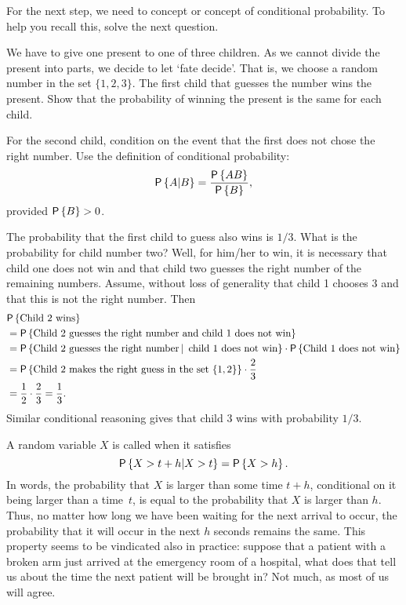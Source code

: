 For the next step, we need to concept or  concept of conditional probability. To help you recall this, solve the next question.

\begin{exercise} 
  We have to give one present to one of three children. As we cannot
  divide the present into parts, we decide to let `fate decide'. That
  is, we choose a random number in the set $\{1, 2, 3\}$. The first
  child that guesses the number wins the present. Show that the
  probability of winning the present is the same for each child.
  \begin{hint}
    For the second child, condition on the event that the first does not chose the right number.
    Use the definition of conditional probability:
    \begin{equation*}
    \P{A|B} = \frac{\P{AB}}{\P{B}}, 
    \end{equation*}
provided $\P{B}>0$.
  \end{hint}
\begin{solution}
    The probability that the first child to guess also wins is
    $1/3$. What is the probability for child number two? Well, for
    him/her to win, it is necessary that child one does not win and
    that child two guesses the right number of the remaining
    numbers. Assume, without loss of generality that child 1 chooses
    $3$ and that this is not the right number. Then 
    \begin{equation*}
      \begin{split}
&\P{\text{Child  2 wins}} \\
&= \P{\text{Child 2 guesses the right number and child 1 does not win}} \\
&= \P{\text{Child 2 guesses the right number} \given \text{ child 1 does not win}}
\cdot \P{\text{Child 1 does not win}} \\
&= \P{\text{Child 2 makes the right guess in the set $\{1,2\}$}}\cdot \frac 23 \\
&= \frac 1 2\cdot \frac 23  = \frac 1 3.
      \end{split}
    \end{equation*}
    Similar conditional reasoning gives that child 3 wins with probability $1/3$. 
  \end{solution}
\end{exercise}


A random variable $X$ is called  when it satisfies
\begin{equation*}
  \P{X > t+h | X>t} = \P{X>h}.
\end{equation*}
In words, the probability that $X$ is larger than some time $t+h$,
conditional on it being larger than a time~$t$, is equal to the
probability that $X$ is larger than $h$. Thus, no matter how long we
have been waiting for the next arrival to occur, the probability that
it will occur in the next $h$ seconds remains the same.  This property
seems to be vindicated also in practice: suppose that a patient with a
broken arm just arrived at the emergency room of a hospital, what does
that tell us about the time the next patient will be brought in? Not
much, as most of us will agree.



